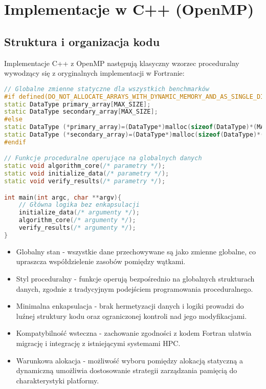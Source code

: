 \section{Implementacje w C++ (OpenMP)}
\subsection{Struktura i organizacja kodu}
Implementacje C++ z OpenMP następują klasyczny wzorzec proceduralny wywodzący się z oryginalnych implementacji w Fortranie:

\begin{lstlisting}[language=C++, caption={Struktura kodu benchmarków w języku C++ z OpenMP}, label={lst:openmp_structure}]
// Globalne zmienne statyczne dla wszystkich benchmarków
#if defined(DO_NOT_ALLOCATE_ARRAYS_WITH_DYNAMIC_MEMORY_AND_AS_SINGLE_DIMENSION)
static DataType primary_array[MAX_SIZE];
static DataType secondary_array[MAX_SIZE];
#else
static DataType (*primary_array)=(DataType*)malloc(sizeof(DataType)*(MAX_SIZE));
static DataType (*secondary_array)=(DataType*)malloc(sizeof(DataType)*(MAX_SIZE));
#endif

// Funkcje proceduralne operujące na globalnych danych
static void algorithm_core(/* parametry */);
static void initialize_data(/* parametry */);
static void verify_results(/* parametry */);

int main(int argc, char **argv){
    // Główna logika bez enkapsulacji
    initialize_data(/* argumenty */);
    algorithm_core(/* argumenty */);
    verify_results(/* argumenty */);
}
\end{lstlisting}
\begin{itemize}
    \item Globalny stan - wszystkie dane przechowywane są jako zmienne globalne, co upraszcza współdzielenie zasobów pomiędzy wątkami.
    
    \item Styl proceduralny - funkcje operują bezpośrednio na globalnych strukturach danych, zgodnie z tradycyjnym podejściem programowania proceduralnego.
    
    \item Minimalna enkapsulacja - brak hermetyzacji danych i logiki prowadzi do luźnej struktury kodu oraz ograniczonej kontroli nad jego modyfikacjami.
    
    \item Kompatybilność wsteczna - zachowanie zgodności z kodem Fortran ułatwia migrację i integrację z istniejącymi systemami HPC.
    
    \item Warunkowa alokacja - możliwość wyboru pomiędzy alokacją statyczną a dynamiczną umożliwia dostosowanie strategii zarządzania pamięcią do charakterystyki platformy.
\end{itemize}
  
